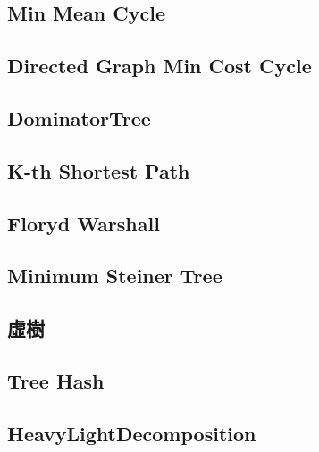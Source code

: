 \documentclass[a4paper,10pt,twocolumn,oneside]{article}
\begin{document}
\subsection{Min Mean Cycle}


\subsection{Directed Graph Min Cost Cycle}


\subsection{DominatorTree}


\subsection{K-th Shortest Path}


\subsection{Floryd Warshall}


%

\subsection{Minimum Steiner Tree}


\subsection{虛樹}


\subsection{Tree Hash}
%


\subsection{HeavyLightDecomposition}

\end{document}
